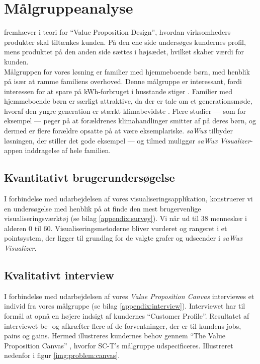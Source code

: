 \section{Målgruppeanalyse}
\cite{osterwalder} fremhæver i teori for “Value Proposition Design”, hvordan virksomheders produkter skal tiltænkes kunden. På den ene side undersøges kundernes profil, mens produktet på den anden side sættes i højsædet, hvilket skaber værdi for kunden.\\

Målgruppen for vores løsning er familier med hjemmeboende børn, med henblik på især at ramme familiens overhoved. Denne målgruppe er interessant, fordi interessen for at spare på kWh-forbruget i husstande stiger \cite[p. 34]{ens.dk}. Familier med hjemmeboende børn er særligt attraktive, da der er tale om et generationsmøde, hvoraf den yngre generation er stærkt klimabevidste \citep{energiwatch}. Flere studier — som for eksempel \cite{gronhoj} — peger på at forældrenes klimahandlinger smitter af på deres børn, og dermed er flere forældre opsatte på at være eksemplariske. \emph{saWux} tilbyder løsningen, der stiller det gode eksempel — og tilmed muliggør \emph{saWux Visualizer}-appen inddragelse af hele familien.

\subsection{Kvantitativt brugerundersøgelse}
I forbindelse med udarbejdelsen af vores visualiseringsapplikation, konstruerer vi en undersøgelse med henblik på at finde den mest brugervenlige visualiseringsværktøj (se bilag \ref{appendix:survey}). Vi når ud til 38 mennesker i alderen 0 til 60. Visualiseringsmetoderne bliver vurderet og rangeret i et pointsystem, der ligger til grundlag for de valgte grafer og udseender i \emph{saWux Visualizer}.

\subsection{Kvalitativt interview}
I forbindelse med udarbejdelsen af vores \emph{Value Proposition Canvas} interviewes et individ fra vores målgruppe (se bilag \ref{appendix:interview}). Interviewet har til formål at opnå en højere indsigt af kundernes “Customer Profile”. Resultatet af interviewet be- og afkræfter flere af de forventninger, der er til kundens jobs, pains og gains. Hermed illustreres kundernes behov gennem “The Value Proposition Canvas” \citep{osterwalder}, hvorfor SC-T’s målgruppe udspecificeres. Illustreret nedenfor i figur \ref{img:problem:canvas}.

